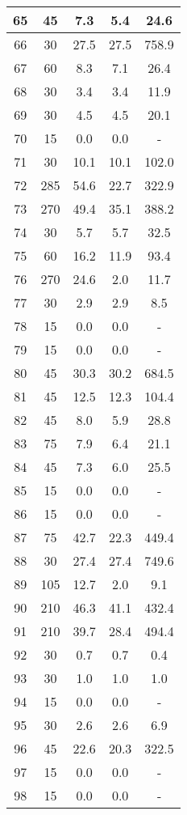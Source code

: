 \documentclass[a4paper,10pt]{article}
\begin{document}
\begin{table}
\begin{tabular}{|c|c|c|c|c|}
\hline
65 & 45 & 7.3 & 5.4 & 24.6 \\
\hline
66 & 30 & 27.5 & 27.5 & 758.9 \\
\hline
67 & 60 & 8.3 & 7.1 & 26.4 \\
\hline
68 & 30 & 3.4 & 3.4 & 11.9 \\
\hline
69 & 30 & 4.5 & 4.5 & 20.1 \\
\hline
70 & 15 & 0.0 & 0.0 & - \\
\hline
71 & 30 & 10.1 & 10.1 & 102.0 \\
\hline
72 & 285 & 54.6 & 22.7 & 322.9 \\
\hline
73 & 270 & 49.4 & 35.1 & 388.2 \\
\hline
74 & 30 & 5.7 & 5.7 & 32.5 \\
\hline
75 & 60 & 16.2 & 11.9 & 93.4 \\
\hline
76 & 270 & 24.6 & 2.0 & 11.7 \\
\hline
77 & 30 & 2.9 & 2.9 & 8.5 \\
\hline
78 & 15 & 0.0 & 0.0 & - \\
\hline
79 & 15 & 0.0 & 0.0 & - \\
\hline
80 & 45 & 30.3 & 30.2 & 684.5 \\
\hline
81 & 45 & 12.5 & 12.3 & 104.4 \\
\hline
82 & 45 & 8.0 & 5.9 & 28.8 \\
\hline
83 & 75 & 7.9 & 6.4 & 21.1 \\
\hline
84 & 45 & 7.3 & 6.0 & 25.5 \\
\hline
85 & 15 & 0.0 & 0.0 & - \\
\hline
86 & 15 & 0.0 & 0.0 & - \\
\hline
87 & 75 & 42.7 & 22.3 & 449.4 \\
\hline
88 & 30 & 27.4 & 27.4 & 749.6 \\
\hline
89 & 105 & 12.7 & 2.0 & 9.1 \\
\hline
90 & 210 & 46.3 & 41.1 & 432.4 \\
\hline
91 & 210 & 39.7 & 28.4 & 494.4 \\
\hline
92 & 30 & 0.7 & 0.7 & 0.4 \\
\hline
93 & 30 & 1.0 & 1.0 & 1.0 \\
\hline
94 & 15 & 0.0 & 0.0 & - \\
\hline
95 & 30 & 2.6 & 2.6 & 6.9 \\
\hline
96 & 45 & 22.6 & 20.3 & 322.5 \\
\hline
97 & 15 & 0.0 & 0.0 & - \\
\hline
98 & 15 & 0.0 & 0.0 & - \\

\end{tabular}
\end{table}
\end{document}

